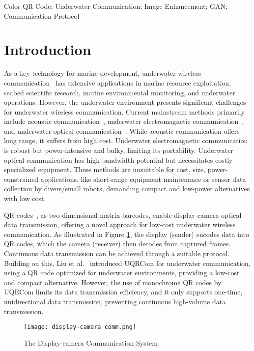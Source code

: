 \documentclass[preprint,12pt]{elsarticle}
\begin{document}
\begin{frontmatter}
\begin{keyword}
Color QR Code; Underwater Communication; Image Enhancement; GAN; Communication Protocol
\end{keyword}

\end{frontmatter}

\section{Introduction}
As a key technology for marine development, underwater wireless communication~\cite{Qu2024Review,Jaafar2022Overview,Ali2020} has extensive applications in marine resource exploitation, seabed scientific research, marine environmental monitoring, and underwater operations. However, the underwater environment presents significant challenges for underwater wireless communication. Current mainstream methods primarily include acoustic communication~\cite{Zia2021}, underwater electromagnetic communication~\cite{Zoksimovski2012}, and underwater optical communication~\cite{Al2021, s2020Optical}. While acoustic communication offers long range, it suffers from high cost. Underwater electromagnetic communication is robust but power-intensive and bulky, limiting its portability. Underwater optical communication has high bandwidth potential but necessitates costly specialized equipment. These methods are unsuitable for cost, size, power-constrained applications, like short-range equipment maintenance or sensor data collection by divers/small robots, demanding compact and low-power alternatives with low cost.

QR codes~\cite{pandya2014survey}, as two-dimensional matrix barcodes, enable display-camera optical data transmission, offering a novel approach for low-cost underwater wireless communication.
As illustrated in Figure \ref{sccom}, the display (sender) encodes data into QR codes, which the camera (receiver) then decodes from captured frames.
Continuous data transmission can be achieved through a suitable protocol. 
Building on this, Liu et al.~\cite{liu2023uqrcom} introduced UQRCom for underwater communication, using a QR code optimized for underwater environments, providing a low-cost and compact alternative. 
However, the use of monochrome QR codes by UQRCom limits its data transmission efficiency, and it only supports one-time, unidirectional data transmission, preventing continuous high-volume data transmission.

\begin{figure}[H]
\centering
\texttt{[image: display-camera comm.png]}
\caption{The Display-camera Communication System\label{sccom}}
\end{figure}
\end{document}
